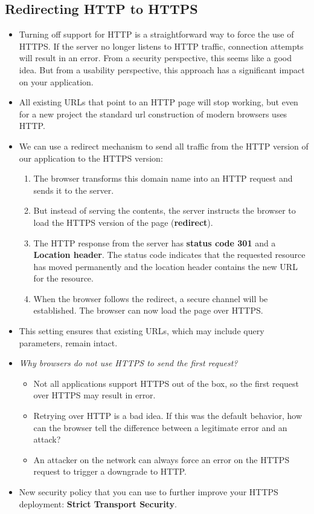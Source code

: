 \documentclass[../main.tex]{subfiles}
\begin{document}
\subsection{Redirecting HTTP to HTTPS}
\begin{itemize}
\item Turning off support for HTTP is a straightforward way to force the use of HTTPS. If the server no longer listens to HTTP traffic, connection attempts will result in an error. From a security perspective, this seems like a good idea. But from a usability perspective, this approach has a significant impact on your application.
\item All existing URLs that point to an HTTP page will stop working, but even for a new project the standard url construction of modern browsers uses HTTP.
\item We can use a redirect mechanism to send all traffic from the HTTP version of our application to the HTTPS version: 
\begin{enumerate}
\item The browser transforms this domain name into an HTTP request and sends it to the server.
\item But instead of serving the contents, the server instructs the browser to load the HTTPS version of the page (\textbf{redirect}).
\item The HTTP response from the server has \textbf{status code 301} and a \textbf{Location header}. The status code indicates that the requested resource has moved permanently and the location header contains the new URL for the resource.
\item When the browser follows the redirect, a secure channel will be established. The browser can now load the page over HTTPS.
\end{enumerate}
\item This setting ensures that existing URLs, which may include query parameters, remain intact.
\item \emph{Why browsers do not use HTTPS to send the first request?}
\begin{itemize}
\item Not all applications support HTTPS out of the box, so the first request over HTTPS may result in error.
\item Retrying over HTTP is a bad idea. If this was the default behavior, how can the browser tell the difference between a legitimate error and an attack?
\item An attacker on the network can always force an error on the HTTPS request to trigger a downgrade to HTTP.
\end{itemize}
\item New security policy that you can use to further improve your HTTPS deployment: \textbf{Strict Transport Security}.
\end{itemize}
\end{document}
